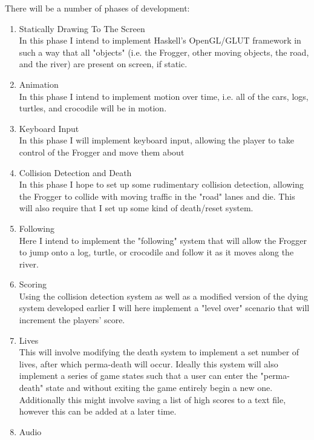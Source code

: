 \documentclass[12pt]{article}
\begin{document}
\maketitle

There will be a number of phases of development:
\begin{enumerate}
  \item Statically Drawing To The Screen\\
        In this phase I intend to implement Haskell's OpenGL/GLUT framework in such a way that all "objects" (i.e. the Frogger, other moving objects, the road, and the river) are present on screen, if static.
      \item Animation\\
        In this phase I intend to implement motion over time, i.e. all of the cars, logs, turtles, and crocodile will be in motion.
      \item Keyboard Input\\
        In this phase I will implement keyboard input, allowing the player to take control of the Frogger and move them about
      \item Collision Detection and Death\\
        In this phase I hope to set up some rudimentary collision detection, allowing the Frogger to collide with moving traffic in the "road" lanes and die.
        This will also require that I set up some kind of death/reset system.
      \item Following\\
        Here I intend to implement the "following" system that will allow the Frogger to jump onto a log, turtle, or crocodile and follow it as it moves along the river.
      \item Scoring\\
        Using the collision detection system as well as a modified version of the dying system developed earlier I will here implement a "level over" scenario that will increment the players' score.
      \item Lives\\
        This will involve modifying the death system to implement a set number of lives, after which perma-death will occur.
        Ideally this system will also implement a series of game states such that a user can enter the "perma-death" state and without exiting the game entirely begin a new one.
        Additionally this might involve saving a list of high scores to a text file, however this can be added at a later time.
      \item Audio\\

\end{enumerate}
\end{document}
